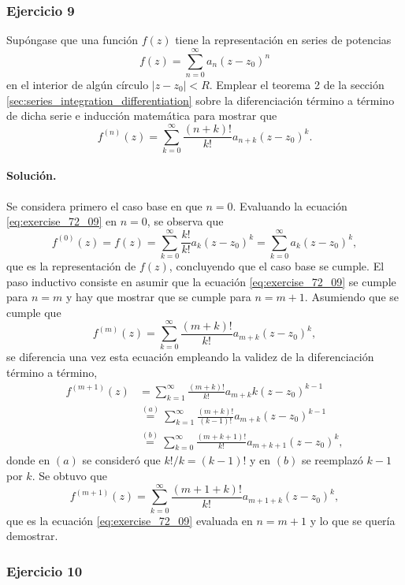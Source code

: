 \documentclass[a4paper]{report}
\begin{document}
\subsubsection*{Ejercicio 9}

Supóngase que una función \(f(z)\) tiene la representación en series de potencias
\[
 f(z)=\sum_{n=0}^\infty a_{n}(z-z_0)^n
\]
en el interior de algún círculo \(|z-z_0|<R\). Emplear el teorema 2 de la sección \ref{sec:series_integration_differentiation} sobre la diferenciación término a término de dicha serie e inducción matemática para mostrar que 
\begin{equation}\label{eq:exercise_72_09}
 f^{(n)}(z)=\sum_{k=0}^\infty\frac{(n+k)!}{k!}a_{n+k}(z-z_0)^k. 
\end{equation}

\paragraph{Solución.} Se considera primero el caso base en que \(n=0\). Evaluando la ecuación \ref{eq:exercise_72_09} en \(n=0\), se observa que
\[
 f^{(0)}(z)=f(z)=\sum_{k=0}^\infty\frac{k!}{k!}a_{k}(z-z_0)^k=\sum_{k=0}^\infty a_{k}(z-z_0)^k,
\]
que es la representación de \(f(z)\), concluyendo que el caso base se cumple. El paso inductivo consiste en asumir que la ecuación \ref{eq:exercise_72_09} se cumple para \(n=m\) y hay que mostrar que se cumple para \(n=m+1\). Asumiendo que se cumple que 
\[
  f^{(m)}(z)=\sum_{k=0}^\infty\frac{(m+k)!}{k!}a_{m+k}(z-z_0)^k, 
\]
se diferencia una vez esta ecuación empleando la validez de la diferenciación término a término,
\begin{align*}
 f^{(m+1)}(z)&=\sum_{k=1}^\infty\frac{(m+k)!}{k!}a_{m+k}k(z-z_0)^{k-1}\\
  &\overset{(a)}{=}\sum_{k=1}^\infty\frac{(m+k)!}{(k-1)!}a_{m+k}(z-z_0)^{k-1}\\
  &\overset{(b)}{=}\sum_{k=0}^\infty\frac{(m+k+1)!}{k!}a_{m+k+1}(z-z_0)^k,
\end{align*}
donde en \((a)\) se consideró que \(k!/k=(k-1)!\) y en \((b)\) se reemplazó \(k-1\) por \(k\). Se obtuvo que 
\[
 f^{(m+1)}(z)=\sum_{k=0}^\infty\frac{(m+1+k)!}{k!}a_{m+1+k}(z-z_0)^k,
\]
que es la ecuación \ref{eq:exercise_72_09} evaluada en \(n=m+1\) y lo que se quería demostrar.

\subsubsection*{Ejercicio 10}
\end{document}
